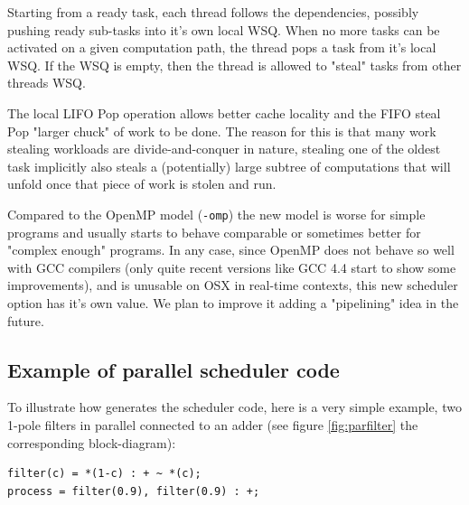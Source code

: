Starting from a ready task, each thread follows the dependencies, possibly pushing ready sub-tasks into it's own local WSQ. When no more tasks can be activated on a given computation path, the thread pops a task from it's local WSQ. If the WSQ is empty, then the thread is allowed to "steal" tasks from other threads WSQ.

The local LIFO Pop operation allows better cache locality and the FIFO steal Pop "larger chuck" of work to be done. The reason for this is that many work stealing workloads are divide-and-conquer in nature, stealing one of the oldest task implicitly also steals a (potentially) large subtree of computations that will unfold once that piece of work is stolen and run.

Compared to the OpenMP model (\lstinline!-omp!) the new model is worse for simple \faust  programs and usually starts to behave comparable or sometimes better for "complex enough" \faust  programs. In any case, since OpenMP does not behave so well with GCC compilers (only quite recent versions like GCC 4.4 start to show some improvements), and is unusable on OSX in real-time contexts, this new scheduler option has it's own value.  We plan to improve it adding a "pipelining" idea in the future.

\subsection{Example of parallel scheduler code}
To illustrate how \faust generates the scheduler code, here is a very simple example, two 1-pole filters in parallel connected to an adder (see figure \ref{fig:parfilter} the corresponding block-diagram):

\begin{lstlisting}
filter(c) = *(1-c) : + ~ *(c);
process = filter(0.9), filter(0.9) : +; 
\end{lstlisting}


